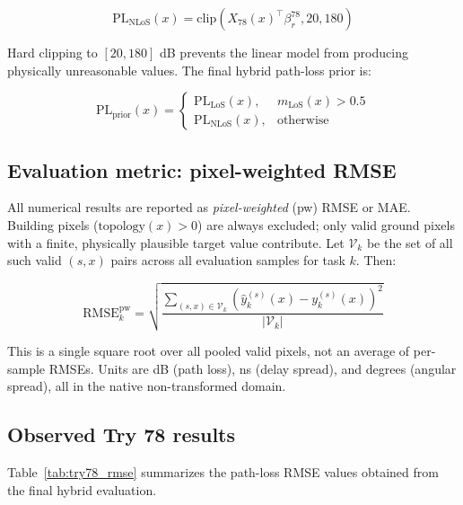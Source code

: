 \documentclass[11pt,a4paper]{article}
\begin{document}
\begin{equation}
\mathrm{PL}_{\mathrm{NLoS}}(x)
=
\mathrm{clip}\!\left(
X_{78}(x)^\top \beta^{78}_{r},
20,
180
\right)
\label{eq:pl_nlos_final}
\end{equation}

Hard clipping to $[20, 180]$ dB prevents the linear model from producing
physically unreasonable values. The final hybrid path-loss prior is:

\begin{equation}
\mathrm{PL}_{\mathrm{prior}}(x)
=
\begin{cases}
\mathrm{PL}_{\mathrm{LoS}}(x), & m_{\mathrm{LoS}}(x) > 0.5 \\
\mathrm{PL}_{\mathrm{NLoS}}(x), & \text{otherwise}
\end{cases}
\label{eq:pl_hybrid}
\end{equation}

\subsection{Evaluation metric: pixel-weighted RMSE}

\label{sec:pw_metric}

All numerical results are reported as \emph{pixel-weighted} (pw) RMSE or MAE.
Building pixels ($\mathrm{topology}(x) > 0$) are always excluded; only valid
ground pixels with a finite, physically plausible target value contribute.
Let $\mathcal{V}_k$ be the set of all such valid $(s, x)$ pairs across all
evaluation samples for task $k$. Then:

\begin{equation}
\mathrm{RMSE}^{\mathrm{pw}}_k
=
\sqrt{
  \frac{\displaystyle\sum_{(s,x)\in\mathcal{V}_k}
  \left(\hat{y}_k^{(s)}(x) - y_k^{(s)}(x)\right)^2}
  {\displaystyle|\mathcal{V}_k|}
}
\label{eq:rmse_pw}
\end{equation}

This is a single square root over all pooled valid pixels, not an average of
per-sample RMSEs. Units are dB (path loss), ns (delay spread), and
degrees (angular spread), all in the native non-transformed domain.

\subsection{Observed Try 78 results}

Table~\ref{tab:try78_rmse} summarizes the path-loss RMSE values obtained from
the final hybrid evaluation.
\end{document}
